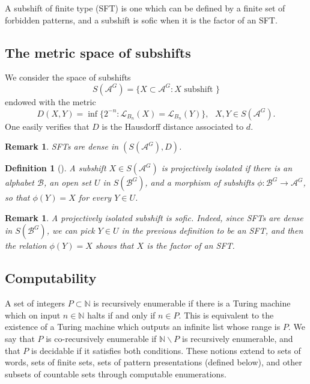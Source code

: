 \documentclass[a4paper,oneside]{amsart}
\renewcommand{\(}{\begin{dmath*}}
\renewcommand{\)}{\end{dmath*}}
\newtheorem{definition}[theorem]{Definition}
\newtheorem{remark}[theorem]{Remark}
\theoremstyle{definition}
\newcommand{\N}{\mathbb{N}}
\newcommand{\Le}{\mathcal{L}}
\newcommand{\A}{\mathcal{A}}
\newcommand{\B}{\mathcal{B}}
\begin{document}
A subshift of finite type (SFT) is one which can be defined by a finite set of forbidden patterns, and a subshift is sofic when it  is the factor of an SFT. 


\subsection{The metric space of subshifts}
We consider the space of subshifts
\[S(\A^G)=\{X\subset \A^G : \text{$X$ subshift }\}\] endowed with the metric 
\[D(X,Y)=\inf\{2^{-n} : \Le_{B_n}(X)=\Le_{B_n}(Y)\}, \ \  \ X,Y\in S(\A^G).\]
One easily verifies that $D$ is the Hausdorff distance associated to $d$.

\begin{remark}
SFTs are dense in $(S(\A^G),D)$.
\end{remark}
\begin{definition}[\cite{doucha_strong_2024}]\label{def:projectively-isolated}
A subshift $X\in S(\A^G)$ is projectively isolated if there is an alphabet $\B$, an open set $U$ in $S(\B^G)$, and a morphism of subshifts $\phi\colon \B^G\to \A^G$, so that $\phi(Y)=X$ for every $Y\in U$. 
\end{definition}
\begin{remark}
    A projectively isolated subshift is sofic. Indeed, since SFTs are dense in $S(\B^G)$, we can pick $Y\in U$ in the previous definition to be an SFT, and then the relation $\phi(Y)=X$ shows that $X$ is the factor of an SFT. 
\end{remark}
\subsection{Computability}
A set of integers $P\subset \N$ is recursively enumerable if there is a Turing machine which on input $n\in\N$ halts if and only if $n\in P$. This is equivalent to the existence of a Turing machine which outputs an infinite list whose range is $P$. We say that $P$ is co-recursively enumerable if $\N\smallsetminus P$ is recursively enumerable, and that $P$ is decidable if it satisfies both conditions. These notions extend to sets of words, sets of finite sets, sets of pattern presentations (defined below), and other subsets of countable sets through computable enumerations. %
\end{document}
